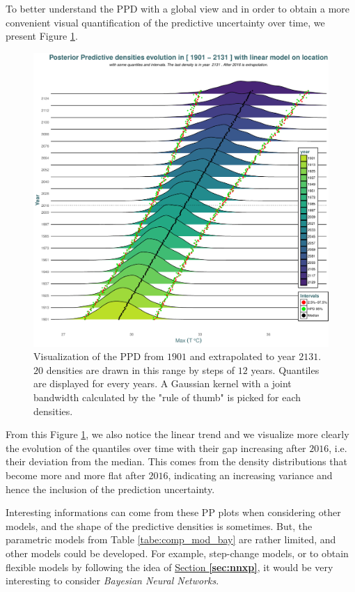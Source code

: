  To better understand the PPD with a global view and in order to obtain a more convenient visual quantification of the predictive uncertainty over time, we present Figure \ref{fig:post_pred}.

 \begin{figure}[!htb]
  	\centering	\includegraphics[width=0.8\linewidth]{predpred.pdf}\caption{Visualization of the PPD from $1901$ and extrapolated to year $2131$. $20$ densities are drawn in this range by steps of $12$ years. Quantiles are displayed for every years.  A Gaussian kernel with a joint bandwidth calculated by the \citet[pp.48, (3.31)]{silverman_1986} "rule of thumb" is picked for each densities.}\label{fig:post_pred}
 \end{figure}
  
  From this Figure \ref{fig:post_pred},  we also notice the linear trend and we visualize more clearly the evolution of the quantiles over time with their gap increasing after $2016$, i.e. their deviation from the median. This comes from the density distributions that become more and more flat after $2016$, indicating an increasing variance and hence the inclusion of the prediction uncertainty. 

Interesting informations can come from these PP plots when considering other models, and the shape of the predictive densities is sometimes. But, the parametric models from Table \ref{tabe:comp_mod_bay} are rather limited, and other models could be developed. For example, step-change models, or to obtain flexible models by following the idea of \hyperref[sec:nnxp]{Section \textbf{\ref{sec:nnxp}}}, it would be very interesting to consider \emph{Bayesian Neural Networks}.

